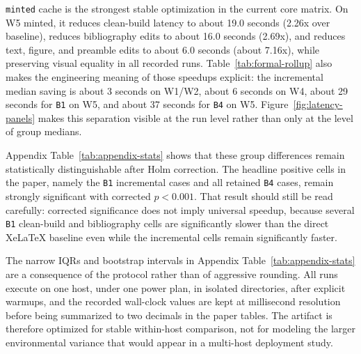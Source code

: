 \documentclass[11pt]{article}
\begin{document}
\texttt{minted} cache is the strongest stable optimization in the current core matrix. On W5 minted, it reduces clean-build latency to about 19.0 seconds (2.26x over baseline), reduces bibliography edits to about 16.0 seconds (2.69x), and reduces text, figure, and preamble edits to about 6.0 seconds (about 7.16x), while preserving visual equality in all recorded runs. Table~\ref{tab:formal-rollup} also makes the engineering meaning of those speedups explicit: the incremental median saving is about 3 seconds on W1/W2, about 6 seconds on W4, about 29 seconds for \texttt{B1} on W5, and about 37 seconds for \texttt{B4} on W5. Figure~\ref{fig:latency-panels} makes this separation visible at the run level rather than only at the level of group medians.

Appendix Table~\ref{tab:appendix-stats} shows that these group differences remain statistically distinguishable after Holm correction. The headline positive cells in the paper, namely the \texttt{B1} incremental cases and all retained \texttt{B4} cases, remain strongly significant with corrected $p < 0.001$. That result should still be read carefully: corrected significance does not imply universal speedup, because several \texttt{B1} clean-build and bibliography cells are significantly slower than the direct XeLaTeX baseline even while the incremental cells remain significantly faster.

The narrow IQRs and bootstrap intervals in Appendix Table~\ref{tab:appendix-stats} are a consequence of the protocol rather than of aggressive rounding. All runs execute on one host, under one power plan, in isolated directories, after explicit warmups, and the recorded wall-clock values are kept at millisecond resolution before being summarized to two decimals in the paper tables. The artifact is therefore optimized for stable within-host comparison, not for modeling the larger environmental variance that would appear in a multi-host deployment study.
\end{document}
